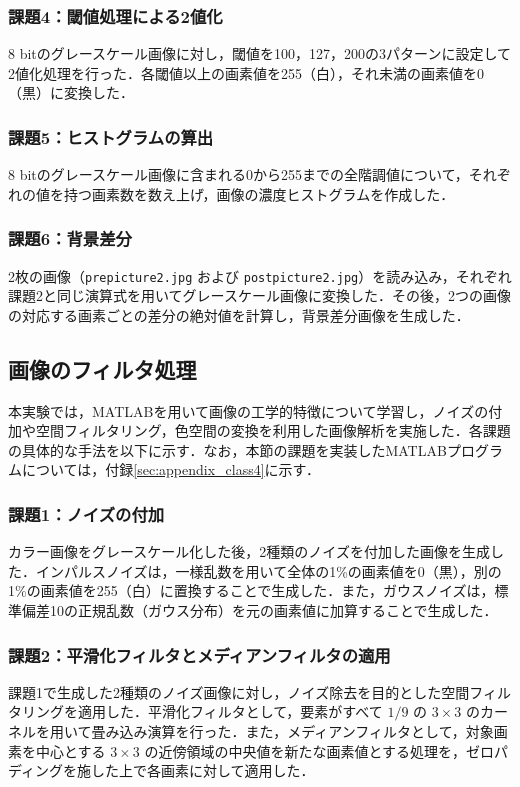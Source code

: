 \documentclass[paper=a4, fontsize=10pt]{jlreq}
\begin{document}
\subsubsection{課題4：閾値処理による2値化}
8 bitのグレースケール画像に対し，閾値を100，127，200の3パターンに設定して2値化処理を行った．各閾値以上の画素値を255（白），それ未満の画素値を0（黒）に変換した．

\subsubsection{課題5：ヒストグラムの算出}
8 bitのグレースケール画像に含まれる0から255までの全階調値について，それぞれの値を持つ画素数を数え上げ，画像の濃度ヒストグラムを作成した．

\subsubsection{課題6：背景差分}
2枚の画像（\texttt{prepicture2.jpg} および \texttt{postpicture2.jpg}）を読み込み，それぞれ課題2と同じ演算式を用いてグレースケール画像に変換した．その後，2つの画像の対応する画素ごとの差分の絶対値を計算し，背景差分画像を生成した．

\subsection{画像のフィルタ処理}

本実験では，MATLABを用いて画像の工学的特徴について学習し，ノイズの付加や空間フィルタリング，色空間の変換を利用した画像解析を実施した．各課題の具体的な手法を以下に示す．なお，本節の課題を実装したMATLABプログラムについては，付録\ref{sec:appendix_class4}に示す．

\subsubsection{課題1：ノイズの付加}
カラー画像をグレースケール化した後，2種類のノイズを付加した画像を生成した．インパルスノイズは，一様乱数を用いて全体の1\%の画素値を0（黒），別の1\%の画素値を255（白）に置換することで生成した．また，ガウスノイズは，標準偏差10の正規乱数（ガウス分布）を元の画素値に加算することで生成した．

\subsubsection{課題2：平滑化フィルタとメディアンフィルタの適用}
課題1で生成した2種類のノイズ画像に対し，ノイズ除去を目的とした空間フィルタリングを適用した．平滑化フィルタとして，要素がすべて $1/9$ の $3 \times 3$ のカーネルを用いて畳み込み演算を行った．また，メディアンフィルタとして，対象画素を中心とする $3 \times 3$ の近傍領域の中央値を新たな画素値とする処理を，ゼロパディングを施した上で各画素に対して適用した．
\end{document}
